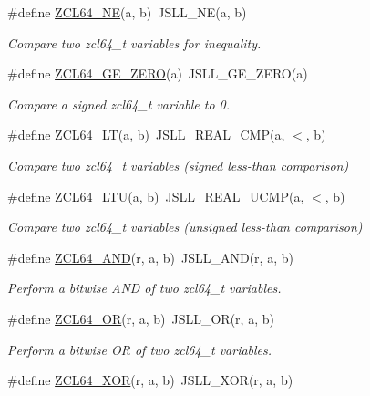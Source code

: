 \begin{DoxyCompactItemize}
\#define \hyperlink{group__zcl__64_gaffa76b2bdfb8bc021db06efe331a2e5f}{Z\-C\-L64\-\_\-\-N\-E}(a, b)~J\-S\-L\-L\-\_\-\-N\-E(a, b)
\begin{DoxyCompactList}\small\item\em Compare two zcl64\-\_\-t variables for inequality. \end{DoxyCompactList}\item 
\#define \hyperlink{group__zcl__64_ga524b42ba2596f4c0392780c540f5d5b6}{Z\-C\-L64\-\_\-\-G\-E\-\_\-\-Z\-E\-R\-O}(a)~J\-S\-L\-L\-\_\-\-G\-E\-\_\-\-Z\-E\-R\-O(a)
\begin{DoxyCompactList}\small\item\em Compare a signed zcl64\-\_\-t variable to 0. \end{DoxyCompactList}\item 
\#define \hyperlink{group__zcl__64_ga3ec91495319f42f4ba341768a10a77b7}{Z\-C\-L64\-\_\-\-L\-T}(a, b)~J\-S\-L\-L\-\_\-\-R\-E\-A\-L\-\_\-\-C\-M\-P(a, $<$, b)
\begin{DoxyCompactList}\small\item\em Compare two zcl64\-\_\-t variables (signed less-\/than comparison) \end{DoxyCompactList}\item 
\#define \hyperlink{group__zcl__64_gaa6db62833f3681442d99ef64ef0ab61e}{Z\-C\-L64\-\_\-\-L\-T\-U}(a, b)~J\-S\-L\-L\-\_\-\-R\-E\-A\-L\-\_\-\-U\-C\-M\-P(a, $<$, b)
\begin{DoxyCompactList}\small\item\em Compare two zcl64\-\_\-t variables (unsigned less-\/than comparison) \end{DoxyCompactList}\item 
\#define \hyperlink{group__zcl__64_ga6f960291ee8e41a8a45421b0b27b62b9}{Z\-C\-L64\-\_\-\-A\-N\-D}(r, a, b)~J\-S\-L\-L\-\_\-\-A\-N\-D(r, a, b)
\begin{DoxyCompactList}\small\item\em Perform a bitwise A\-N\-D of two zcl64\-\_\-t variables. \end{DoxyCompactList}\item 
\#define \hyperlink{group__zcl__64_gaa6e4aa82c20efd4b30cf9af31672d867}{Z\-C\-L64\-\_\-\-O\-R}(r, a, b)~J\-S\-L\-L\-\_\-\-O\-R(r, a, b)
\begin{DoxyCompactList}\small\item\em Perform a bitwise O\-R of two zcl64\-\_\-t variables. \end{DoxyCompactList}\item 
\#define \hyperlink{group__zcl__64_gaa6a22393c0d8c9d674b8a90d316413d3}{Z\-C\-L64\-\_\-\-X\-O\-R}(r, a, b)~J\-S\-L\-L\-\_\-\-X\-O\-R(r, a, b)

\end{DoxyCompactItemize}
